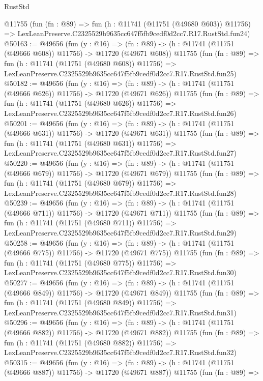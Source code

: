 \begin{lexlean}{RustStd}
\begin{coremodule}
    @11755
    (fun (fn : @89) =>
    fun (h : @11741 (@11751 (@49680 @603)) @11756) =>
    LexLeanPreserve.C2325529b9635cc647f5fb9cedf0d2cc7.R17.RustStd.fun24)
@50163 := @49656
    (fun (y : @16) =>
    (fn : @89) -> (h : @11741 (@11751 (@49666 @608)) @11756) -> @11720 (@49671 @608))
    @11755
    (fun (fn : @89) =>
    fun (h : @11741 (@11751 (@49680 @608)) @11756) =>
    LexLeanPreserve.C2325529b9635cc647f5fb9cedf0d2cc7.R17.RustStd.fun25)
@50182 := @49656
    (fun (y : @16) =>
    (fn : @89) -> (h : @11741 (@11751 (@49666 @626)) @11756) -> @11720 (@49671 @626))
    @11755
    (fun (fn : @89) =>
    fun (h : @11741 (@11751 (@49680 @626)) @11756) =>
    LexLeanPreserve.C2325529b9635cc647f5fb9cedf0d2cc7.R17.RustStd.fun26)
@50201 := @49656
    (fun (y : @16) =>
    (fn : @89) -> (h : @11741 (@11751 (@49666 @631)) @11756) -> @11720 (@49671 @631))
    @11755
    (fun (fn : @89) =>
    fun (h : @11741 (@11751 (@49680 @631)) @11756) =>
    LexLeanPreserve.C2325529b9635cc647f5fb9cedf0d2cc7.R17.RustStd.fun27)
@50220 := @49656
    (fun (y : @16) =>
    (fn : @89) -> (h : @11741 (@11751 (@49666 @679)) @11756) -> @11720 (@49671 @679))
    @11755
    (fun (fn : @89) =>
    fun (h : @11741 (@11751 (@49680 @679)) @11756) =>
    LexLeanPreserve.C2325529b9635cc647f5fb9cedf0d2cc7.R17.RustStd.fun28)
@50239 := @49656
    (fun (y : @16) =>
    (fn : @89) -> (h : @11741 (@11751 (@49666 @711)) @11756) -> @11720 (@49671 @711))
    @11755
    (fun (fn : @89) =>
    fun (h : @11741 (@11751 (@49680 @711)) @11756) =>
    LexLeanPreserve.C2325529b9635cc647f5fb9cedf0d2cc7.R17.RustStd.fun29)
@50258 := @49656
    (fun (y : @16) =>
    (fn : @89) -> (h : @11741 (@11751 (@49666 @775)) @11756) -> @11720 (@49671 @775))
    @11755
    (fun (fn : @89) =>
    fun (h : @11741 (@11751 (@49680 @775)) @11756) =>
    LexLeanPreserve.C2325529b9635cc647f5fb9cedf0d2cc7.R17.RustStd.fun30)
@50277 := @49656
    (fun (y : @16) =>
    (fn : @89) -> (h : @11741 (@11751 (@49666 @849)) @11756) -> @11720 (@49671 @849))
    @11755
    (fun (fn : @89) =>
    fun (h : @11741 (@11751 (@49680 @849)) @11756) =>
    LexLeanPreserve.C2325529b9635cc647f5fb9cedf0d2cc7.R17.RustStd.fun31)
@50296 := @49656
    (fun (y : @16) =>
    (fn : @89) -> (h : @11741 (@11751 (@49666 @882)) @11756) -> @11720 (@49671 @882))
    @11755
    (fun (fn : @89) =>
    fun (h : @11741 (@11751 (@49680 @882)) @11756) =>
    LexLeanPreserve.C2325529b9635cc647f5fb9cedf0d2cc7.R17.RustStd.fun32)
@50315 := @49656
    (fun (y : @16) =>
    (fn : @89) -> (h : @11741 (@11751 (@49666 @887)) @11756) -> @11720 (@49671 @887))
    @11755
    (fun (fn : @89) =>

\end{coremodule}
\end{lexlean}
